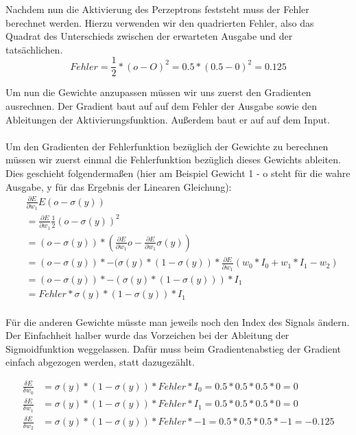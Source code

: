 \documentclass[a4paper]{article}
\begin{document}
Nachdem nun die Aktivierung des Perzeptrons feststeht muss der Fehler berechnet werden. Hierzu verwenden wir den quadrierten Fehler, also das Quadrat des Unterschieds zwischen der erwarteten Ausgabe und der tatsächlichen.
\[
	Fehler = \frac{1}{2} * (o - O)^2 = 0.5 * (0.5 - 0)^2 = 0.125
\]

Um nun die Gewichte anzupassen müssen wir uns zuerst den Gradienten ausrechnen.
Der Gradient baut auf auf dem Fehler der Ausgabe sowie den Ableitungen der Aktivierungsfunktion. Außerdem baut er auf auf dem Input.
\paragraph{}
Um den Gradienten der Fehlerfunktion bezüglich der Gewichte zu berechnen müssen wir zuerst einmal die Fehlerfunktion bezüglich dieses Gewichts ableiten. Dies geschieht folgendermaßen (hier am Beispiel Gewicht 1 - o steht für die wahre Ausgabe, y für das Ergebnis der Linearen Gleichung):
\begin{align*}
	&\frac{\partial E}{\partial w_1} E(o - \sigma(y)) \\ 
	&= \frac{\partial E}{\partial w_1} \frac{1}{2}(o - \sigma(y))^2 \\
	&= (o - \sigma(y)) * (\frac{\partial E}{\partial w_1}o - \frac{\partial E}{\partial w_1}\sigma(y)) \\
	&= (o - \sigma(y)) * -(\sigma(y) * (1 - \sigma(y)) * \frac{\partial E}{\partial w_1}(w_0*I_0 + w_1*I_1-w_2) \\
	&= (o - \sigma(y)) * -(\sigma(y) * (1 - \sigma(y))) * I_1 \\
	&= Fehler * \sigma(y) * (1 - \sigma(y)) * I_1 
\end{align*}
\paragraph{}
Für die anderen Gewichte müsste man jeweils noch den Index des Signals ändern.
Der Einfachheit halber wurde das Vorzeichen bei der Ableitung der Sigmoidfunktion weggelassen. Dafür muss beim Gradientenabstieg der Gradient einfach abgezogen werden, statt dazugezählt.

\begin{align*}
	\frac{\delta E}{\delta w_0} &= \sigma(y) * (1 - \sigma(y)) * Fehler * I_0 = 0.5 * 0.5 * 0.5 * 0 = 0 \\
	\frac{\delta E}{\delta w_1} &= \sigma(y) * (1 - \sigma(y)) * Fehler * I_1 = 0.5 * 0.5 * 0.5 * 0 = 0 \\
	\frac{\delta E}{\delta w_2} &= \sigma(y) * (1 - \sigma(y)) * Fehler * -1 = 0.5 * 0.5 * 0.5 * -1 = -0.125
\end{align*}
\end{document}
